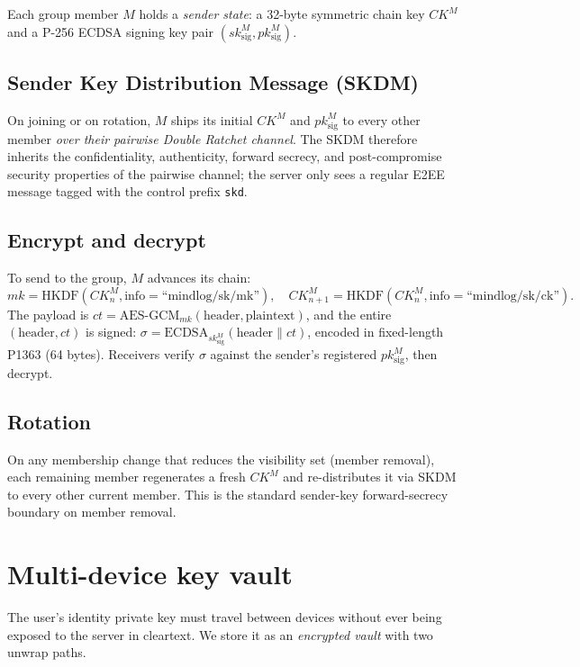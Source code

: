 \documentclass[11pt,a4paper]{article}
\newcommand{\code}[1]{\texttt{\small #1}}
\begin{document}
Each group member $M$ holds a \emph{sender state}: a 32-byte symmetric
chain key $CK^M$ and a P-256 ECDSA signing key pair
$(sk^M_\text{sig}, pk^M_\text{sig})$.

\subsection{Sender Key Distribution Message (SKDM)}

On joining or on rotation, $M$ ships its initial $CK^M$ and
$pk^M_\text{sig}$ to every other member \emph{over their pairwise
Double Ratchet channel}. The SKDM therefore inherits the confidentiality,
authenticity, forward secrecy, and post-compromise security properties of
the pairwise channel; the server only sees a regular E2EE message tagged
with the control prefix \code{skd}.

\subsection{Encrypt and decrypt}

To send to the group, $M$ advances its chain:
\[
mk = \mathrm{HKDF}(CK^M_n, \text{info}=\text{``mindlog/sk/mk''}), \quad
CK^M_{n+1} = \mathrm{HKDF}(CK^M_n, \text{info}=\text{``mindlog/sk/ck''}).
\]
The payload is
$ct = \mathrm{AES\text{-}GCM}_{mk}(\text{header}, \text{plaintext})$,
and the entire $(\text{header}, ct)$ is signed:
$\sigma = \mathrm{ECDSA}_{sk^M_\text{sig}}(\text{header} \| ct)$,
encoded in fixed-length P1363 (64 bytes). Receivers verify $\sigma$
against the sender's registered $pk^M_\text{sig}$, then decrypt.

\subsection{Rotation}

On any membership change that reduces the visibility set (member
removal), each remaining member regenerates a fresh $CK^M$ and
re-distributes it via SKDM to every other current member. This is the
standard sender-key forward-secrecy boundary on member removal.

\section{Multi-device key vault}

The user's identity private key must travel between devices without ever
being exposed to the server in cleartext. We store it as an
\emph{encrypted vault} with two unwrap paths.
\end{document}
